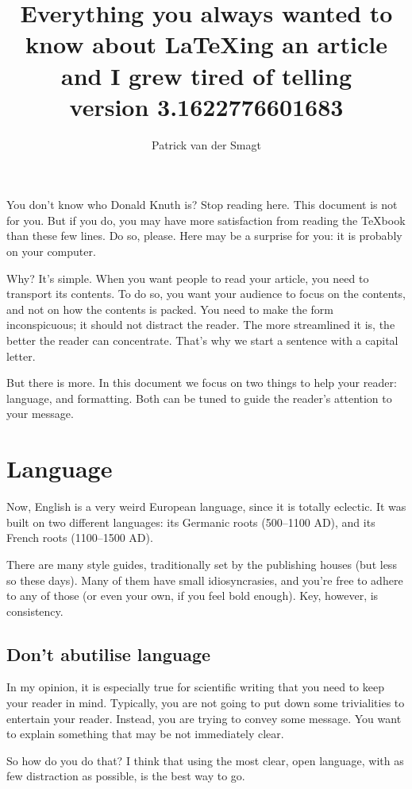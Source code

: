 \documentclass{article}
\title{Everything you always wanted to know about \LaTeX ing an article 
and I grew tired of telling\\[1ex]
\footnotesize{version 3.1622776601683}}
\author{Patrick van der Smagt}
\begin{document}
\maketitle

You don't know who Donald Knuth is?  Stop reading here.  This document is 
not for you.  But if you do, you may have more satisfaction from reading 
the \TeX book than these few lines.   Do so, please. Here may be a surprise for you: it is probably on your computer.

Why?
It's simple.
When you want people to read your article, you need to transport its contents. 
To do so, you want your audience to focus on the contents, and not on how the contents is packed.
You need to make the form inconspicuous; it should not distract the reader.
The more streamlined it is, the better the reader can concentrate.
That's why we start a sentence with a capital letter.

But there is more.  In this document we focus on two things to help your reader: language, and formatting.  Both can be tuned to guide the reader's attention to your message.



\section{Language}
Now, English is a very weird European language, since it is totally eclectic.  It was built on two different languages: its Germanic roots (500--1100 AD), and its French roots (1100--1500 AD).  


There are many style guides, traditionally set by the publishing houses (but less so these days).
Many of them have small idiosyncrasies, and you're free to adhere to any of those (or even your own, if you feel bold enough).
Key, however, is consistency.

\subsection{Don't abutilise language}
In my opinion, it is especially true for scientific writing that you need to keep your reader in mind. Typically, you are not going to put down some trivialities to entertain your reader. Instead, you are trying to convey some message. You want to explain something that may be not immediately clear.

So how do you do that?  I think that using the most clear, open language, with as few distraction as possible, is the best way to go.
\end{document}
